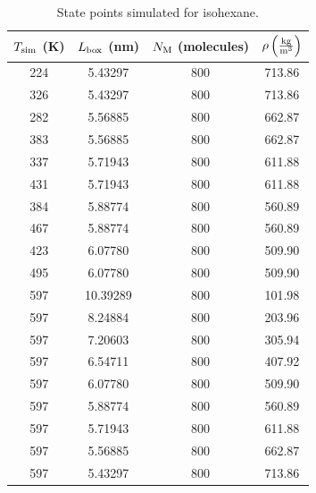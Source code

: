 \documentclass[journal=jctc,manuscript=article]{achemso}
\begin{document}
\begin{table}[p!]
	\caption{State points simulated for isohexane.} \label{tab:IC6H14 state points}
	\begin{center}
		\begin{tabular}{|c|c|c|c|}
			\hline
			$T_{\rm sim}$ (K) & $L_{\rm box}$ (nm) & $N_{\rm M}$ (molecules) & $\rho \left(\frac{\rm kg}{\rm m^3}\right)$ \\ \hline
			224 & 5.43297  & 800 & 713.86 \\
			326 & 5.43297  & 800 & 713.86 \\
			282 & 5.56885  & 800 & 662.87 \\
			383 & 5.56885  & 800 & 662.87 \\
			337 & 5.71943  & 800 & 611.88 \\
			431 & 5.71943  & 800 & 611.88 \\
			384 & 5.88774  & 800 & 560.89 \\
			467 & 5.88774  & 800 & 560.89 \\
			423 & 6.07780  & 800 & 509.90 \\
			495 & 6.07780  & 800 & 509.90 \\
			597 & 10.39289 & 800 & 101.98 \\
			597 & 8.24884  & 800 & 203.96 \\
			597 & 7.20603  & 800 & 305.94 \\
			597 & 6.54711  & 800 & 407.92 \\
			597 & 6.07780  & 800 & 509.90 \\
			597 & 5.88774  & 800 & 560.89 \\
			597 & 5.71943  & 800 & 611.88 \\
			597 & 5.56885  & 800 & 662.87 \\
			597 & 5.43297  & 800 & 713.86 \\
			\hline
		\end{tabular}
	\end{center}
\end{table}
\end{document}
